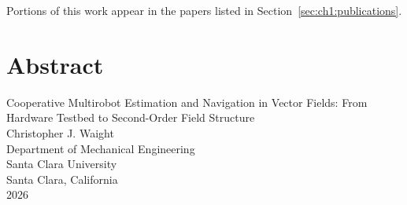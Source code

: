 \documentclass[12pt, letterpaper, oneside]{report}
\newcommand{\thesistitle}{Cooperative Multirobot Estimation and Navigation in Vector Fields: From Hardware Testbed to Second-Order Field Structure}
\newcommand{\thesisauthor}{Christopher J. Waight}
\newcommand{\thesisdepartment}{Mechanical Engineering}
\newcommand{\thesisyear}{2026}
\begin{document}
Portions of this work appear in the papers listed in
Section~\ref{sec:ch1:publications}.

\clearpage

\chapter*{Abstract}

\begin{center}
  \thesistitle \\[6pt]
  \thesisauthor \\[6pt]
  Department of \thesisdepartment \\
  Santa Clara University \\
  Santa Clara, California \\
  \thesisyear
\end{center}

\vspace{0.4in}
\end{document}
